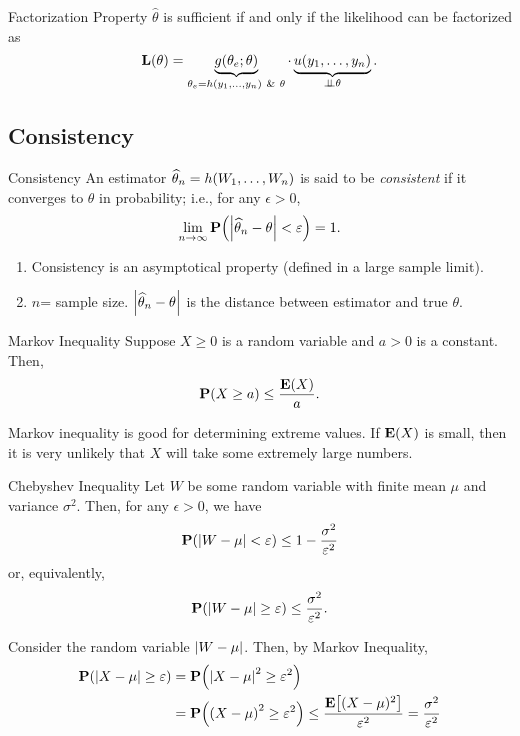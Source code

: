 \begin{thm}{Factorization Property}
	$\hat\theta$ is sufficient if and only if the likelihood can be factorized as \[\L(\theta)=\underbrace{g(\theta_e;\theta)}_{\theta_e=h(y_1,\dots,y_n)\ \&\ \theta}\cdot \underbrace{u(y_1,\dots,y_n)}_{\independ\theta}.\]	
\end{thm}

\subsection{Consistency}
\begin{df}{Consistency}
	An estimator $\widehat\theta_n=h\qty(W_1,\dots,W_n)$ is said to be \textit{consistent} if it converges to $\theta$ in probability; i.e., for any $\epsilon>0$, \[\lim_{n\to\infty}\vb{P}\qty(\abs{\widehat\theta_n-\theta}<\varepsilon)=1.\]
\end{df}
\begin{rmk}
\begin{enumerate}
	\item Consistency is an asymptotical property (defined in a large sample limit).
	\item $n$= sample size. $\abs{\widehat\theta_n-\theta}$ is the distance between estimator and true $\theta$.
\end{enumerate}	
\end{rmk}
\begin{lem}{Markov Inequality}
	Suppose $X\geq0$ is a random variable and $a>0$ is a constant. Then, \[\vb{P}(X\geq a)\leq\dfrac{\vb{E}(X)}{a}.\]
\end{lem}
\begin{rmk}
	Markov inequality is good for determining extreme values. If $\vb{E}(X)$ is small, then it is very unlikely that $X$ will take some extremely large numbers. 	
\end{rmk}
\begin{thm}{Chebyshev Inequality}
	Let $W$ be some random variable with finite mean $\mu$ and variance $\sigma^2$. Then, for any $\epsilon>0$, we have \[\vb{P}\qty(\qty|W-\mu|<\varepsilon)\leq 1-\dfrac{\sigma^2}{\varepsilon^2}\] or, equivalently, \[\vb{P}\qty(\qty|W-\mu|\geq\varepsilon)\leq\dfrac{\sigma^2}{\varepsilon^2}.\]
\end{thm}
\begin{prf}
	Consider the random variable $\abs{W-\mu}$. Then, by Markov Inequality, \begin{align*}\vb{P}\qty(\abs{X-\mu}\geq\varepsilon)&=\vb{P}\qty(\abs{X-\mu}^2\geq\varepsilon^2)\\&=\vb{P}\qty(\qty(X-\mu)^2\geq\varepsilon^2)\leq\dfrac{\vb{E}\qty[(X-\mu)^2]}{\varepsilon^2}=\dfrac{\sigma^2}{\varepsilon^2}\end{align*}	
\end{prf}
